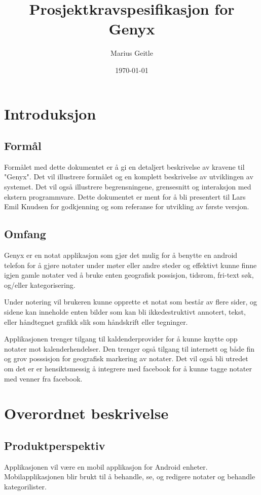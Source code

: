 \documentclass[a4paper, 12pt]{article}
\begin{document}
\title{Prosjektkravspesifikasjon for Genyx}
\author{Marius Geitle}
\date{\today}

\maketitle
\tableofcontents
\listoffigures

\section{Introduksjon}
\subsection{Formål}
Formålet med dette dokumentet er å gi en detaljert beskrivelse av kravene til "Genyx". Det vil illustrere formålet og en komplett beskrivelse av utviklingen av systemet. Det vil også illustrere begrensningene, grensesnitt og interaksjon med ekstern programmvare. Dette dokumentet er ment for å bli presentert til Lars Emil Knudsen for godkjenning og som referanse for utvikling av første versjon.


\subsection{Omfang}
Genyx er en notat applikasjon som gjør det mulig for å benytte en android telefon for å gjøre notater under møter eller andre steder og effektivt kunne finne igjen gamle notater ved å bruke enten geografisk possisjon, tidsrom, fri-text søk, og/eller kategorisering.

Under notering vil brukeren kunne opprette et notat som består av flere sider, og sidene kan inneholde enten bilder som kan bli ikkedestruktivt annotert, tekst, eller håndtegnet grafikk slik som håndskrift eller tegninger.

Applikasjonen trenger tilgang til kaldenderprovider for å kunne knytte opp notater mot kalenderhendelser. Den trenger også tilgang til internett og både fin og grov posssisjon for geografisk markering av notater. Det vil også bli utredet om det er er hensiktsmessig å integrere med facebook for å kunne tagge notater med venner fra facebook.

\section{Overordnet beskrivelse}
\subsection{Produktperspektiv}
Applikasjonen vil være en mobil applikasjon for Android enheter. Mobilapplikasjonen blir brukt til å behandle, se, og redigere notater og behandle kategorilister.
\end{document}
